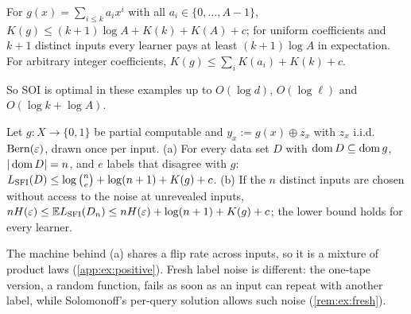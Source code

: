 \begin{example}\label{ex:ex:poly}
For $g(x)=\sum_{i\le k}a_ix^i$ with all $a_i\in\{0,\dots,A-1\}$, $K(g)\le(k+1)\log A+K(k)+K(A)+c$; for uniform coefficients and $k+1$ distinct inputs every learner pays at least $(k+1)\log A$ in expectation. For arbitrary integer coefficients, $K(g)\le\sum_iK(a_i)+K(k)+c$.
\end{example}

So SOI is optimal in these examples up to $O(\log d)$, $O(\log\ell)$ and $O(\log k+\log A)$.

\begin{proposition}\label{prop:ex:frozen}
Let $g:X\to\{0,1\}$ be partial computable and $y_x:=g(x)\oplus z_x$ with $z_x$ i.i.d.\ $\operatorname{Bern}(\varepsilon)$, drawn once per input.
(a) For every data set $D$ with $\operatorname{dom} D\subseteq\operatorname{dom} g$, $|\operatorname{dom} D|=n$, and $e$ labels that disagree with $g$: $L_{\mathrm{SFI}}(D)\le\log\binom ne+\log(n+1)+K(g)+c$.
(b) If the $n$ distinct inputs are chosen without access to the noise at unrevealed inputs, $nH(\varepsilon)\le\mathbb{E}L_{\mathrm{SFI}}(D_n)\le nH(\varepsilon)+\log(n+1)+K(g)+c$; the lower bound holds for every learner.
\end{proposition}

The machine behind (a) shares a flip rate across inputs, so it is a mixture of product laws (\cref{app:ex:positive}). Fresh label noise is different: the one-tape version, a random function, fails as soon as an input can repeat with another label, while Solomonoff's per-query solution allows such noise (\cref{rem:ex:fresh}).

